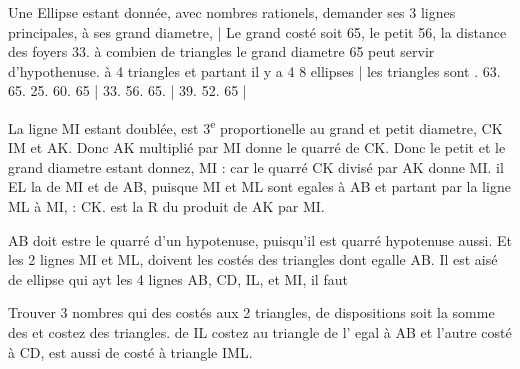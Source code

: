 \documentclass[11pt,a4paper]{article}
\begin{document}
Une Ellipse estant donnée, avec \ill{} \ill{} nombres rationels, \ill{} demander ses 3 lignes principales, à  \ill{} ses grand diametre, \ill{} \ill{} | Le grand costé soit 65, le petit 56, la distance des foyers 33.  à combien de triangles le grand diametre 65 peut servir d'hypothenuse.  à 4 triangles et partant il y a 4 \ill{}  8 ellipses | les triangles sont . 63. 65. 25. 60. 65 | 33. 56. 65. | 39. 52. 65 |

La ligne MI estant doublée, est 3\textsuperscript{e} proportionelle au grand et petit diametre, \ill{} CK \ill{} \ill{} \ill{} IM et AK. Donc AK multiplié par MI donne le quarré de CK. Donc le petit et le grand diametre estant donnez, \ill{} MI : car le quarré CK divisé par AK donne MI. \ill{} \ill{} il \ill{} \ill{} \ill{} EL \ill{} \ill{} la \ill{} de MI et \ill{} de AB, puisque MI et ML sont egales à AB et partant par la ligne ML \ill{} à MI,  : CK. est la R du produit de AK par MI.


AB doit estre le quarré d'un hypotenuse, puisqu'il est quarré  hypotenuse aussi. Et les 2 lignes MI et ML, doivent \ill{} \ill{} les costés  \ill{} \ill{} \ill{} des triangles dont \ill{} egalle AB. Il est aisé de \ill{} \ill{} ellipse qui ayt les 4 lignes  AB, CD, IL, et MI, \ill{} il faut

Trouver 3 nombres qui  des costés aux 2 triangles,  de \ill{} dispositions soit la somme des  et \ill{} \ill{} costez des triangles. \ill{}  de IL \ill{} \ill{} \ill{} costez au triangle de l' egal à AB et l'autre costé à CD, \ill{} est aussi de costé à \ill{} triangle IML.
\end{document}
